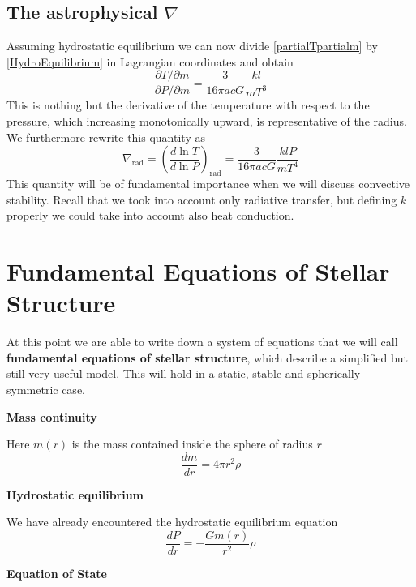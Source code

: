 \subsection{The astrophysical $\nabla$}
Assuming hydrostatic equilibrium we can now divide \ref{partialTpartialm} by \ref{HydroEquilibrium} in Lagrangian coordinates and obtain
\begin{equation}
	\frac{\partial T/\partial m}{\partial P / \partial m} = \frac{3}{16 \pi a c G} \frac{k l}{m T^3}
\end{equation}
This is nothing but the derivative of the temperature with respect to the pressure, which increasing monotonically upward, is representative of the radius. We furthermore rewrite this quantity as
\begin{equation}\label{nablarad}
	\nabla_{\mathrm{rad}} = \left( \frac{d \ln T}{d \ln P}  \right)_{\mathrm{rad}}= \frac{3}{16 \pi a c G} \frac{k l P}{m T^4}
\end{equation}
This quantity will be of fundamental importance when we will discuss convective stability. Recall that we took into account only radiative transfer, but defining $k$ properly we could take into account also heat conduction.
\section{Fundamental Equations of Stellar Structure}
At this point we are able to write down a system of equations that we will call \textbf{fundamental equations of stellar structure}, which describe a simplified but still very useful model. This will hold in a static, stable and spherically symmetric case.

\textbf{Mass continuity} 

Here $m(r)$ is the mass contained inside the sphere of radius $r$
\begin{equation}\label{masscons}
	\frac{dm}{dr}=4 \pi r^2 \rho
\end{equation}

\textbf{Hydrostatic equilibrium} 

We have already encountered the hydrostatic equilibrium equation
\begin{equation}\label{hydroeq}
	\frac{dP}{dr}= - \frac{G m(r)}{r^2} \rho
\end{equation}

\textbf{Equation of State} 

